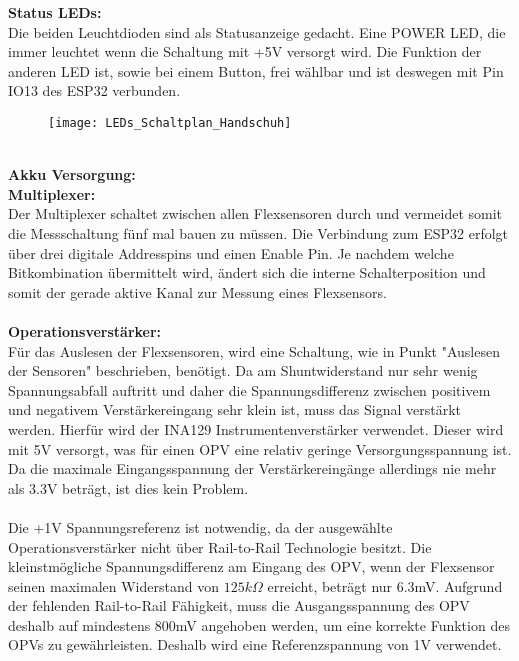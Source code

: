 \documentclass[11pt]{article}
\begin{document}
\textbf{Status LEDs:}
\\
Die beiden Leuchtdioden sind als Statusanzeige gedacht. Eine POWER LED, die immer leuchtet wenn die Schaltung mit +5V
versorgt wird. Die Funktion der anderen LED ist, sowie bei einem Button, frei wählbar und ist deswegen mit Pin IO13 des ESP32
verbunden. \\
\begin{figure}[H]
	\begin{center}
		\scalebox{0.5}
		{\texttt{[image: LEDs\_Schaltplan\_Handschuh]}}
	\end{center}
\end{figure}
\\
\textbf{Akku Versorgung:}
\\ 
\textbf{Multiplexer:}
\\
Der Multiplexer schaltet zwischen allen Flexsensoren durch und vermeidet somit die Messschaltung fünf mal bauen zu müssen. 
Die Verbindung zum ESP32 erfolgt über drei digitale Addresspins und einen Enable Pin. Je nachdem welche Bitkombination übermittelt
wird, ändert sich die interne Schalterposition und somit der gerade aktive Kanal zur Messung eines Flexsensors. \\
\\
\textbf{Operationsverstärker:}
\\
Für das Auslesen der Flexsensoren, wird eine Schaltung, wie in Punkt "Auslesen der Sensoren" beschrieben, benötigt. Da am
Shuntwiderstand nur sehr wenig Spannungsabfall auftritt und daher die Spannungsdifferenz zwischen positivem und negativem 
Verstärkereingang sehr klein ist, muss das Signal verstärkt werden. Hierfür wird der INA129 Instrumentenverstärker verwendet.
Dieser wird mit 5V versorgt, was für einen OPV eine relativ geringe Versorgungsspannung ist. Da die maximale Eingangsspannung
der Verstärkereingänge allerdings nie mehr als 3.3V beträgt, ist dies kein Problem. \\
\\
Die +1V Spannungsreferenz ist notwendig, da der ausgewählte Operationsverstärker nicht über Rail-to-Rail Technologie besitzt. 
Die kleinstmögliche Spannungsdifferenz am Eingang des OPV, wenn der Flexsensor seinen maximalen Widerstand von
$125k\Omega$ erreicht, beträgt nur 6.3mV. Aufgrund der fehlenden Rail-to-Rail Fähigkeit, muss die Ausgangsspannung des OPV deshalb
auf mindestens 800mV angehoben werden, um eine korrekte Funktion des OPVs zu gewährleisten. Deshalb wird eine Referenzspannung
von 1V verwendet. \\
\end{document}

